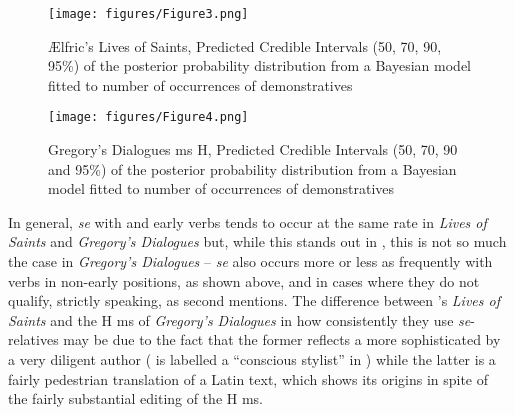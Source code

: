 \documentclass[output=paper,colorlinks,citecolor=brown]{langscibook}
\begin{document}
\begin{figure}[b]
 \centering
 \texttt{[image: figures/Figure3.png]}
 \caption{Ælfric's \textup{Lives of Saints}, Predicted Credible Intervals (50, 70, 90, 95\%) of the posterior probability distribution from a Bayesian model fitted to number of occurrences of demonstratives}
 \label{fig:los:3}
\end{figure}

\begin{figure}
 \centering
 \texttt{[image: figures/Figure4.png]}
 \caption{Gregory's Dialogues ms H, Predicted Credible Intervals (50, 70, 90 and 95\%) of the posterior probability distribution from a Bayesian model fitted to number of occurrences of demonstratives}
 \label{fig:los:4}
\end{figure}

In general, \textit{se} with  and early verbs tends to occur at the same rate in \textit{Lives of Saints} and \textit{Gregory's Dialogues} but, while this stands out in , this is not so much the case in \textit{Gregory's Dialogues} – \textit{se} also occurs more or less as frequently with verbs in non-early positions, as shown above, and in cases where they do not qualify, strictly speaking, as second mentions. The difference between 's \textit{Lives of Saints} and the H ms of \textit{Gregory's Dialogues} in how consistently they use \textit{se}{}-relatives may be due to the fact that the former reflects a more sophisticated  by a very diligent author ( is labelled a “conscious stylist” in \citealt{Hurst1972}) while the latter is a fairly pedestrian translation of a Latin text, which shows its origins in spite of the fairly substantial editing of the H ms.
\end{document}
